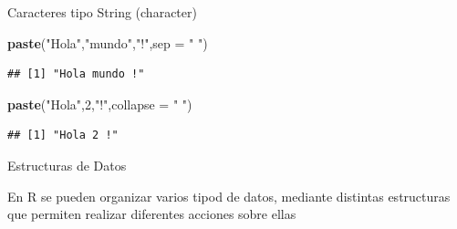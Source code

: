 \documentclass[ignorenonframetext,]{beamer}
\newenvironment{Shaded}{\begin{snugshade}}{\end{snugshade}}
\newcommand{\KeywordTok}[1]{\textcolor[rgb]{0.13,0.29,0.53}{\textbf{#1}}}
\newcommand{\DataTypeTok}[1]{\textcolor[rgb]{0.13,0.29,0.53}{#1}}
\newcommand{\DecValTok}[1]{\textcolor[rgb]{0.00,0.00,0.81}{#1}}
\newcommand{\StringTok}[1]{\textcolor[rgb]{0.31,0.60,0.02}{#1}}
\newcommand{\NormalTok}[1]{#1}
\begin{document}
\begin{frame}[fragile]{Caracteres tipo String (character)}

\begin{Shaded}
\begin{Highlighting}[]
\KeywordTok{paste}\NormalTok{(}\StringTok{"Hola"}\NormalTok{,}\StringTok{"mundo"}\NormalTok{,}\StringTok{"!"}\NormalTok{,}\DataTypeTok{sep =} \StringTok{" "}\NormalTok{)}
\end{Highlighting}
\end{Shaded}

\begin{verbatim}
## [1] "Hola mundo !"
\end{verbatim}

\begin{Shaded}
\begin{Highlighting}[]
\KeywordTok{paste}\NormalTok{(}\StringTok{"Hola"}\NormalTok{,}\DecValTok{2}\NormalTok{,}\StringTok{"!"}\NormalTok{,}\DataTypeTok{collapse =} \StringTok{" "}\NormalTok{)}
\end{Highlighting}
\end{Shaded}

\begin{verbatim}
## [1] "Hola 2 !"
\end{verbatim}

\end{frame}

\begin{frame}{Estructuras de Datos}

En R se pueden organizar varios tipod de datos, mediante distintas
estructuras que permiten realizar diferentes acciones sobre ellas

\end{frame}
\end{document}
